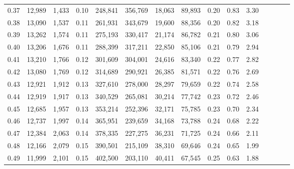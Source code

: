 \begin{tabular}{rrrcrrrrrrrrrrr}
0.37 &  12,989 &  1,433 &                                       0.10 &  248,841 &  356,769 &   18,063 &   89,893 &  0.20 &  0.83 &                         3.30 \\
0.38 &  13,090 &  1,537 &                                       0.11 &  261,931 &  343,679 &   19,600 &   88,356 &  0.20 &  0.82 &                         3.18 \\
0.39 &  13,262 &  1,574 &                                       0.11 &  275,193 &  330,417 &   21,174 &   86,782 &  0.21 &  0.80 &                         3.06 \\
0.40 &  13,206 &  1,676 &                                       0.11 &  288,399 &  317,211 &   22,850 &   85,106 &  0.21 &  0.79 &                         2.94 \\
0.41 &  13,210 &  1,766 &                                       0.12 &  301,609 &  304,001 &   24,616 &   83,340 &  0.22 &  0.77 &                         2.82 \\
0.42 &  13,080 &  1,769 &                                       0.12 &  314,689 &  290,921 &   26,385 &   81,571 &  0.22 &  0.76 &                         2.69 \\
0.43 &  12,921 &  1,912 &                                       0.13 &  327,610 &  278,000 &   28,297 &   79,659 &  0.22 &  0.74 &                         2.58 \\
0.44 &  12,919 &  1,917 &                                       0.13 &  340,529 &  265,081 &   30,214 &   77,742 &  0.23 &  0.72 &                         2.46 \\
0.45 &  12,685 &  1,957 &                                       0.13 &  353,214 &  252,396 &   32,171 &   75,785 &  0.23 &  0.70 &                         2.34 \\
0.46 &  12,737 &  1,997 &                                       0.14 &  365,951 &  239,659 &   34,168 &   73,788 &  0.24 &  0.68 &                         2.22 \\
0.47 &  12,384 &  2,063 &                                       0.14 &  378,335 &  227,275 &   36,231 &   71,725 &  0.24 &  0.66 &                         2.11 \\
0.48 &  12,166 &  2,079 &                                       0.15 &  390,501 &  215,109 &   38,310 &   69,646 &  0.24 &  0.65 &                         1.99 \\
0.49 &  11,999 &  2,101 &                                       0.15 &  402,500 &  203,110 &   40,411 &   67,545 &  0.25 &  0.63 &                         1.88 \\

\end{tabular}
